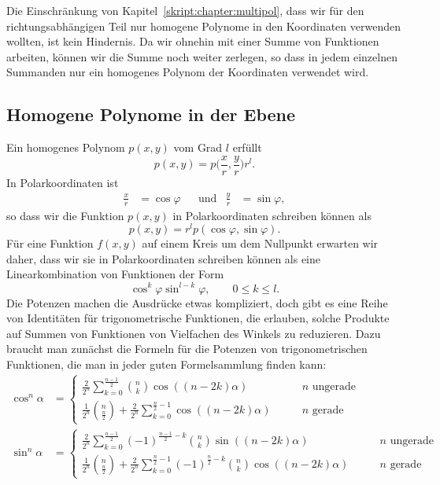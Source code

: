 
Die Einschränkung von Kapitel~\ref{skript:chapter:multipol}, dass wir
für den richtungsabhängigen Teil nur homogene Poly\-nome in den Koordinaten
verwenden wollten, ist kein Hindernis.
Da wir ohnehin mit einer Summe von Funktionen arbeiten, können wir
die Summe noch weiter zerlegen, so dass in jedem einzelnen Summanden nur ein
homogenes Polynom der Koordinaten verwendet wird.

\subsection{Homogene Polynome in der Ebene}
Ein homogenes Polynom $p(x,y)$ vom Grad $l$ erfüllt
\[
p(x,y) = p\biggl(\frac{x}{r},\frac{y}{r}\biggr) r^l.
\]
In Polarkoordinaten ist
\[
\begin{aligned}
\frac{x}{r}&=\cos\varphi
&&\text{und}&
\frac{y}{r}&=\sin\varphi,
\end{aligned}
\]
so dass wir die Funktion $p(x,y)$ in Polarkoordinaten schreiben
können als
\[
p(x,y)=r^l p(\cos\varphi,\sin\varphi).
\]
Für eine Funktion $f(x,y)$ auf einem Kreis um dem Nullpunkt erwarten wir
daher, dass wir sie in Polarkoordinaten schreiben können als eine
Linearkombination von Funktionen der Form
\begin{equation}
\cos^k\varphi \sin^{l-k}\varphi,\qquad 0\le k\le l.
\label{skript:kugelfunktionen:produkte}
\end{equation}
Die Potenzen machen die Ausdrücke etwas kompliziert, doch gibt
es eine Reihe von Identitäten für trigonometrische Funktionen,
die erlauben, solche Produkte auf Summen von Funktionen von 
Vielfachen des Winkels zu reduzieren.
Dazu braucht man zunächst die Formeln für die Potenzen von trigonometrischen
Funktionen, die man in jeder guten Formelsammlung finden kann:
\begin{align*}
\cos^n\alpha
&=
\begin{cases}
\displaystyle
\frac{2}{2^n}\sum_{k=0}^{\frac{n-1}2} \binom{n}{k}\cos((n-2k)\alpha)
&\qquad\text{$n$ ungerade}
\\[10pt]
\displaystyle
\frac{1}{2^n}\binom{n}{\frac{n}2}
+
\frac{2}{2^n}\sum_{k=0}^{\frac{n}2-1}\cos((n-2k)\alpha)
&\qquad\text{$n$ gerade}
\end{cases}
\\
\sin^n\alpha
&=
\begin{cases}
\displaystyle
\frac{2}{2^n}\sum_{k=0}^{\frac{n-1}2} (-1)^{\frac{n-1}2-k}\binom{n}{k}\sin((n-2k)\alpha)
&\qquad\text{$n$ ungerade}
\\[10pt]
\displaystyle
\frac{1}{2^n}\binom{n}{\frac{n}2}
+
\frac{2}{2^n}\sum_{k=0}^{\frac{n}2-1}(-1)^{\frac{n}2-k}\binom{n}{k}\cos((n-2k)\alpha)
&\qquad\text{$n$ gerade}
\end{cases}
\end{align*}
